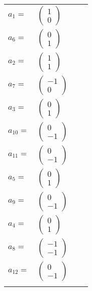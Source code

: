 \documentclass[1p]{elsarticle_modified}
\theoremstyle{definition}
\begin{document}
\begin{tabular}{m{7pt} m{180pt} m{7pt} m{180pt} }
\flushright $a_{1}=$&$\begin{pmatrix}1\\0\end{pmatrix}$ \\
\flushright $a_{6}=$&$\begin{pmatrix}0\\1\end{pmatrix}$ \\
\flushright $a_{2}=$&$\begin{pmatrix}1\\1\end{pmatrix}$ \\
\flushright $a_{7}=$&$\begin{pmatrix}-1\\0\end{pmatrix}$ \\
\flushright $a_{3}=$&$\begin{pmatrix}0\\1\end{pmatrix}$ \\
\flushright $a_{10}=$&$\begin{pmatrix}0\\-1\end{pmatrix}$ \\
\flushright $a_{11}=$&$\begin{pmatrix}0\\-1\end{pmatrix}$ \\
\flushright $a_{5}=$&$\begin{pmatrix}0\\1\end{pmatrix}$ \\
\flushright $a_{9}=$&$\begin{pmatrix}0\\-1\end{pmatrix}$ \\
\flushright $a_{4}=$&$\begin{pmatrix}0\\1\end{pmatrix}$ \\
\flushright $a_{8}=$&$\begin{pmatrix}-1\\-1\end{pmatrix}$ \\
\flushright $a_{12}=$&$\begin{pmatrix}0\\-1\end{pmatrix}$\\&\end{tabular}
\end{document}
